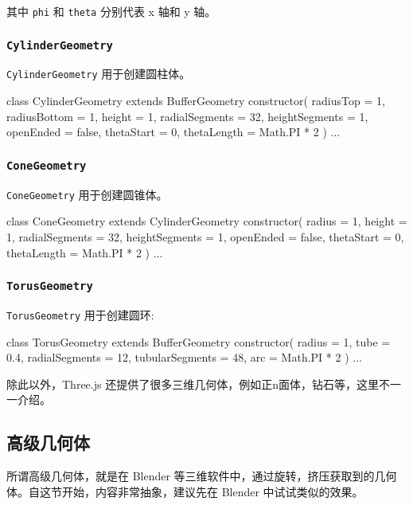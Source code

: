 其中 \texttt{phi} 和 \texttt{theta} 分别代表 x 轴和 y 轴。

\subsubsection*{\texttt{CylinderGeometry}}

\texttt{CylinderGeometry} 用于创建圆柱体。

\begin{JavaScript}
class CylinderGeometry extends BufferGeometry {
	constructor( radiusTop = 1, radiusBottom = 1, height = 1, radialSegments = 32, heightSegments = 1, openEnded = false, thetaStart = 0, thetaLength = Math.PI * 2 )
  ... 
}
\end{JavaScript}

\subsubsection*{\texttt{ConeGeometry}}

\texttt{ConeGeometry} 用于创建圆锥体。

\begin{JavaScript}
class ConeGeometry extends CylinderGeometry {
	constructor( radius = 1, height = 1, radialSegments = 32, heightSegments = 1, openEnded = false, thetaStart = 0, thetaLength = Math.PI * 2 )
  ... 
}
\end{JavaScript}

\subsubsection*{\texttt{TorusGeometry}}

\texttt{TorusGeometry} 用于创建圆环:

\begin{JavaScript}
class TorusGeometry extends BufferGeometry {
	constructor( radius = 1, tube = 0.4, radialSegments = 12, tubularSegments = 48, arc = Math.PI * 2 )
  ... 
}
\end{JavaScript}

除此以外，Three.js 还提供了很多三维几何体，例如正n面体，钻石等，这里不一一介绍。

\subsection{高级几何体}

所谓高级几何体，就是在 Blender 等三维软件中，通过旋转，挤压获取到的几何体。自这节开始，内容非常抽象，建议先在 Blender 中试试类似的效果。

